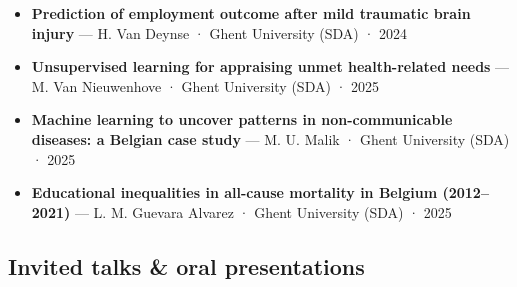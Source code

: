 \documentclass[
  letterpaper,
  DIV=11,
  numbers=noendperiod]{scrartcl}
\begin{document}
\begin{itemize}
  \textbf{Person-days of illness from hospitalization using Belgian
  Hospital Discharge Data} --- P. Coene · Ghent University (SDA) · 2024
\item
  \textbf{Prediction of employment outcome after mild traumatic brain
  injury} --- H. Van Deynse · Ghent University (SDA) · 2024
\item
  \textbf{Unsupervised learning for appraising unmet health-related
  needs} --- M. Van Nieuwenhove · Ghent University (SDA) · 2025
\item
  \textbf{Machine learning to uncover patterns in non-communicable
  diseases: a Belgian case study} --- M. U. Malik · Ghent University
  (SDA) · 2025
\item
  \textbf{Educational inequalities in all-cause mortality in Belgium
  (2012--2021)} --- L. M. Guevara Alvarez · Ghent University (SDA) ·
  2025
\end{itemize}

\subsection{Invited talks \& oral presentations}\label{talks}
\end{document}
